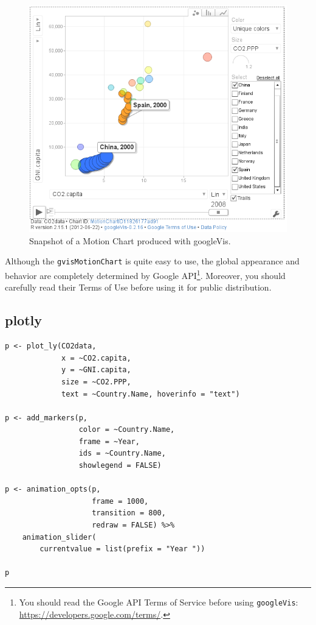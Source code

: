 \documentclass[smallroyalvopaper]{memoir}
\begin{document}
\begin{figure}
  \centering
  \includegraphics[width=\textwidth]{figs/googleVis}
  \caption{Snapshot of a Motion Chart produced with googleVis.}
  \label{fig:googleVis}
\end{figure}


Although the \texttt{gvisMotionChart} is quite easy to use, the global
appearance and behavior are completely determined by Google
API\footnote{You should read the Google API Terms of Service before using
\texttt{googleVis}: \url{https://developers.google.com/terms/}.}. Moreover, you should carefully read their Terms of Use
before using it for public distribution.


\subsection{plotly}
\label{sec:org2257d27}


\lstset{language=r,label= ,caption= ,captionpos=b,numbers=none}
\begin{lstlisting}
p <- plot_ly(CO2data,
             x = ~CO2.capita,
             y = ~GNI.capita,
             size = ~CO2.PPP, 
             text = ~Country.Name, hoverinfo = "text")

p <- add_markers(p,
                 color = ~Country.Name,
                 frame = ~Year,
                 ids = ~Country.Name,
                 showlegend = FALSE)

p <- animation_opts(p,
                    frame = 1000,
                    transition = 800,
                    redraw = FALSE) %>%
    animation_slider(
        currentvalue = list(prefix = "Year "))

p
\end{lstlisting}
\end{document}
